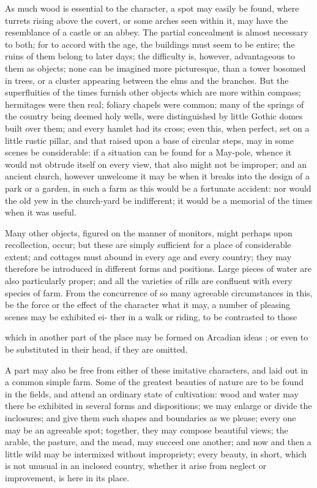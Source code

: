 \documentclass{article}
\begin{document}
As much wood is essential to the character, a spot may easily be found, where turrets rising above the covert, or some arches seen within it, may have the resemblance of a castle or an abbey. The partial concealment is almost necessary to both; for to accord with the age, the buildings must seem to be entire; the ruins of them belong to later days; the difficulty is, however, advantageous to them as objects; none can be imagined more picturesque, than a tower bosomed in trees, or a cluster appearing between the elms and the branches. But the superfluities of the times furnish other objects which are more within compass; hermitages were then real; foliary chapels were common; many of the springs of the country being deemed holy wells, were distinguished by little Gothic domes built over them; and every hamlet had its cross; even this, when perfect, set on a little rustic pillar, and that raised upon a base of circular steps, may in some scenes be considerable: if a situation can be found for a May-pole, whence it would not obtrude itself on every view, that also might not be improper; and an ancient church, however unwelcome it may be when it breaks into the design of a park or a garden, in such a farm as this would be a fortunate accident: nor would the old yew in the church-yard be indifferent; it would be a memorial of the times when it was useful.

Many other objects, figured on the manner of
monitors, might perhaps upon recollection, occur; but
these are simply sufficient for a place of considerable
extent; and cottages must abound in every age and
every country; they may therefore be introduced in
different forms and positions. Large pieces of water
are also particularly proper; and all the varieties of
rills are confluent with every species of farm. From
the concurrence of so many agreeable circumstances in
this, be the force or the effect of the character what it
may, a number of pleasing scenes may be exhibited ei-
ther in a walk or riding, to be contrasted to those

which in another part of the place may be formed on
Arcadian ideas ; or even to be substituted in their head,
if they are omitted.

A part may also be free from either of these imitative characters, and laid out in a common simple farm. Some of the greatest beauties of nature are to be found in the fields, and attend an ordinary state of cultivation: wood and water may there be exhibited in several forms and dispositions; we may enlarge or divide the inclosures; and give them such shapes and boundaries as we please; every one may be an agreeable spot; together, they may compose beautiful views; the arable, the pasture, and the mead, may succeed one another; and now and then a little wild may be intermixed without impropriety; every beauty, in short, which is not unusual in an inclosed country, whether it arise from neglect or improvement, is here in its place.
\end{document}
